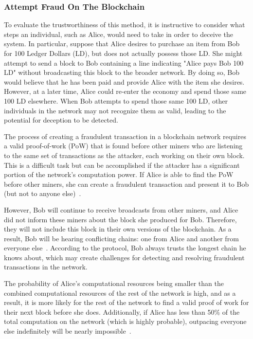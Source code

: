 \subsubsection{Attempt Fraud On The Blockchain}

To evaluate the trustworthiness of this method, it is instructive to consider what steps an individual, such as Alice, would need to take
in order to deceive the system. In particular, suppose that Alice desires to purchase an item from Bob for 100 Ledger Dollars (LD), but
does not actually possess those LD. She might attempt to send a block to Bob containing a line indicating "Alice pays Bob 100 LD"
without broadcasting this block to the broader network. By doing so, Bob would believe that he has been paid and provide Alice with the
item she desires. However, at a later time, Alice could re-enter the economy and spend those same 100 LD elsewhere. When Bob attempts to
spend those same 100 LD, other individuals in the network may not recognize them as valid, leading to the potential for deception to be
detected.

The process of creating a fraudulent transaction in a blockchain network requires a valid proof-of-work (PoW) that is found before other
miners who are listening to the same set of transactions as the attacker, each working on their own block. This is a difficult task but
can be accomplished if the attacker has a significant portion of the network's computation power. If Alice is able to find the PoW before
other miners, she can create a fraudulent transaction and present it to Bob (but not to anyone else)~\cite{fang2022cryptocurrency}.

However, Bob will continue to receive broadcasts from other miners, and Alice did not inform these miners about the block she produced for
Bob. Therefore, they will not include this block in their own versions of the blockchain. As a result, Bob will be hearing conflicting
chains: one from Alice and another from everyone else~\cite{TAN2022101625}. According to the protocol, Bob always trusts the longest
chain he knows about, which may create challenges for detecting and resolving fraudulent transactions in the network.

The probability of Alice's computational resources being smaller than the combined computational resources of the rest of the network is
high, and as a result, it is more likely for the rest of the network to find a valid proof of work for their next block before she does.
Additionally, if Alice has less than 50\% of the total computation on the network (which is highly probable), outpacing everyone else
indefinitely will be nearly impossible~\cite{nakamoto2008bitcoin}.

